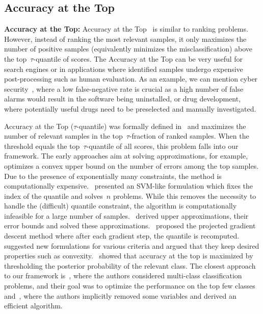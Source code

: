 \subsection{Accuracy at the Top}

\textbf{Accuracy at the Top:} Accuracy at the Top~\cite{boyd2012accuracy, grill2016learning} is similar to ranking problems. However, instead of ranking the most relevant samples, it only maximizes the number of positive samples (equivalently minimizes the misclassification)  above the top~$\tau$-quantile of scores. The Accuracy at the Top can be very useful for search engines or in applications where identified samples undergo expensive post-processing such as human evaluation. As an example, we can mention cyber security~\cite{grill2016learning}, where a low false-negative rate is crucial as a high number of false alarms would result in the software being uninstalled, or drug development, where potentially useful drugs need to be preselected and manually investigated.

Accuracy at the Top ($\tau$-quantile) was formally defined in~\cite{boyd2012accuracy} and maximizes the number of relevant samples in the top~$\tau$-fraction of ranked samples. When the threshold equals the top~$\tau$-quantile of all scores, this problem falls into our framework. The early approaches aim at solving approximations, for example,~\cite{joachims2005svm} optimizes a convex upper bound on the number of errors among the top samples. Due to the presence of exponentially many constraints, the method is computationally expensive.~\cite{boyd2012accuracy} presented an SVM-like formulation which fixes the index of the quantile and solves~$n$ problems. While this removes the necessity to handle the (difficult) quantile constraint, the algorithm is computationally infeasible for a large number of samples.~\cite{kar2015surrogate} derived upper approximations, their error bounds and solved these approximations.~\cite{grill2016learning} proposed the projected gradient descent method where after each gradient step, the quantile is recomputed.~\cite{eban2017scalable} suggested new formulations for various criteria and argued that they keep desired properties such as convexity.~\cite{tasche2018plug} showed that accuracy at the top is maximized by thresholding the posterior probability of the relevant class. The closest approach to our framework is~\cite{lapin2015top,lapin2018analysis}, where the authors considered multi-class classification problems, and their goal was to optimize the performance on the top few classes and~\cite{mackey2018constrained}, where the authors implicitly removed some variables and derived an efficient algorithm.

